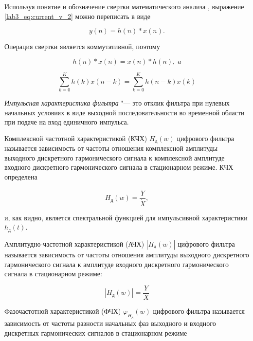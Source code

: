 Используя понятие и обозначение свертки математического анализа \cite{ElementsOfAnalysis}, выражение \eqref{lab3_eq:current_v_2} можно переписать в виде

\begin{equation}
	y(n) = h(n) * x(n).
	\label{lab3_eq:convolution}
\end{equation}

Операция свертки является коммутативной, поэтому

\begin{equation}
	h(n) * x(n) = x(n) * h(n), \; a
	\label{lab3_eq:convolution_v_2}
\end{equation}

\begin{equation}
	\sum\limits_{k=0}^K h(k)x(n-k) = \sum\limits_{k=0}^K h(n-k)x(k)
	\label{lab3_eq:convolution_v_3}
\end{equation}

\emph{Импульсная характеристика фильтра} "--- это отклик фильтра при нулевых начальных условиях в виде выходной последовательности во временной области при подаче на вход единичного импульса.

Комплексной частотной характеристикой (КЧХ) $H_{\text{д}}(w)$ цифрового фильтра называется зависимость от частоты отношения комплексной амплитуды выходного дискретного гармонического сигнала к комплексной амплитуде входного дискретного гармонического сигнала в стационарном режиме. КЧХ определена

\begin{equation}
	H_{\text{д}}(w) = \frac{\dot Y}{\dot X},
	\label{lab3_eq:complex_frequency}
\end{equation}

и, как видно, является спектральной функцией для импульсивной характеристики $h_{\text{д}}(t)$.

Амплитудно-частотной характеристикой (АЧХ) $|H_{\text{д}}(w)|$ цифрового фильтра называется зависимость от частоты отношения амплитуды выходного дискретного гармонического сигнала к амплитуде входного дискретного гармонического сигнала в стационарном режиме:

\begin{equation}
	|H_{\text{д}}(w)| = \frac{Y}{X}
	\label{lab3_eq:frequency_response}
\end{equation}

Фазочастотной характеристикой (ФЧХ) $\varphi_{H_\text{д}} (w)$ цифрового фильтра называется зависимость от частоты разности начальных фаз выходного и входного дискретных гармонических сигналов в стационарном режиме

